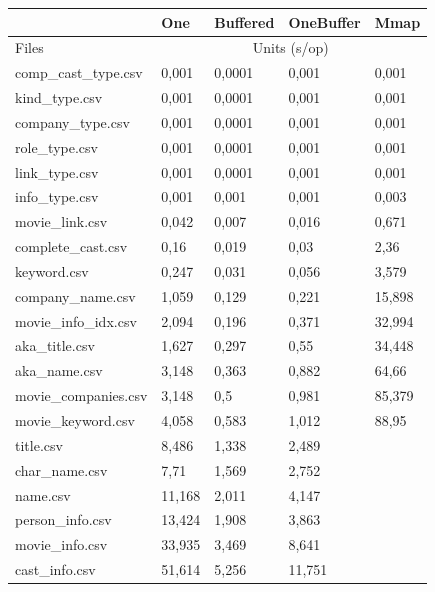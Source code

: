 \documentclass[12pt]{article}
\begin{document}
\begin{table}[H]
\begin{tabular}{|l|l|l|l|l|}
\hline
                     & One    & Buffered & OneBuffer & Mmap   \\ \hline
Files                & \multicolumn{4}{c|}{Units (s/op)}      \\ \hline
comp\_cast\_type.csv & 0,001  & 0,0001   & 0,001     & 0,001  \\ \hline
kind\_type.csv       & 0,001  & 0,0001   & 0,001     & 0,001  \\ \hline
company\_type.csv    & 0,001  & 0,0001   & 0,001     & 0,001  \\ \hline
role\_type.csv       & 0,001  & 0,0001   & 0,001     & 0,001  \\ \hline
link\_type.csv       & 0,001  & 0,0001   & 0,001     & 0,001  \\ \hline
info\_type.csv       & 0,001  & 0,001    & 0,001     & 0,003  \\ \hline
movie\_link.csv      & 0,042  & 0,007    & 0,016     & 0,671  \\ \hline
complete\_cast.csv   & 0,16   & 0,019    & 0,03      & 2,36   \\ \hline
keyword.csv          & 0,247  & 0,031    & 0,056     & 3,579  \\ \hline
company\_name.csv    & 1,059  & 0,129    & 0,221     & 15,898 \\ \hline
movie\_info\_idx.csv & 2,094  & 0,196    & 0,371     & 32,994 \\ \hline
aka\_title.csv       & 1,627  & 0,297    & 0,55      & 34,448 \\ \hline
aka\_name.csv        & 3,148  & 0,363    & 0,882     & 64,66  \\ \hline
movie\_companies.csv & 3,148  & 0,5      & 0,981     & 85,379 \\ \hline
movie\_keyword.csv   & 4,058  & 0,583    & 1,012     & 88,95  \\ \hline
title.csv            & 8,486  & 1,338    & 2,489     &        \\ \hline
char\_name.csv       & 7,71   & 1,569    & 2,752     &        \\ \hline
name.csv             & 11,168 & 2,011    & 4,147     &        \\ \hline
person\_info.csv     & 13,424 & 1,908    & 3,863     &        \\ \hline
movie\_info.csv      & 33,935 & 3,469    & 8,641     &        \\ \hline
cast\_info.csv       & 51,614 & 5,256    & 11,751    &        \\ \hline
\end{tabular}
\end{table}
\end{document}
